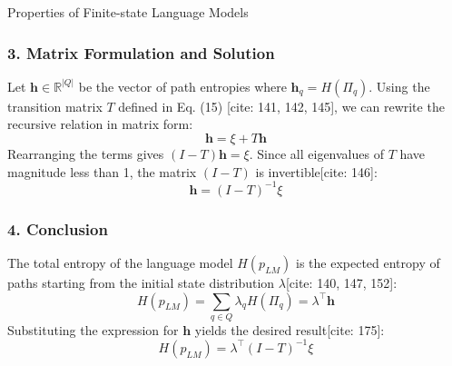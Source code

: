 \begin{question}{Properties of Finite-state Language Models}
\begin{subquestion}
\subsubsection*{3. Matrix Formulation and Solution}
Let $\mathbf{h} \in \mathbb{R}^{|Q|}$ be the vector of path entropies where $\mathbf{h}_q = H(\Pi_q)$. Using the transition matrix $T$ defined in Eq. (15) [cite: 141, 142, 145], we can rewrite the recursive relation in matrix form:
\begin{equation}
    \mathbf{h} = \xi + T\mathbf{h}
\end{equation}
Rearranging the terms gives $(I - T)\mathbf{h} = \xi$. Since all eigenvalues of $T$ have magnitude less than 1, the matrix $(I - T)$ is invertible[cite: 146]:
\begin{equation}
    \mathbf{h} = (I - T)^{-1}\xi
\end{equation}

\subsubsection*{4. Conclusion}
The total entropy of the language model $H(p_{LM})$ is the expected entropy of paths starting from the initial state distribution $\lambda$[cite: 140, 147, 152]:
\begin{equation}
    H(p_{LM}) = \sum_{q \in Q} \lambda_q H(\Pi_q) = \lambda^{\top}\mathbf{h}
\end{equation}
Substituting the expression for $\mathbf{h}$ yields the desired result[cite: 175]:
\begin{equation}
    H(p_{LM}) = \lambda^{\top}(I - T)^{-1}\xi
\end{equation}

\end{subquestion}

\end{question}